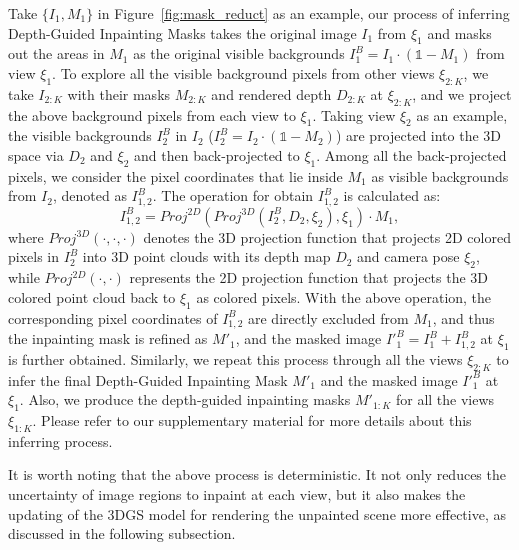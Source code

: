 
Take $\{I_1, M_1\}$ in Figure~\ref{fig:mask_reduct} as an example, our process of inferring Depth-Guided Inpainting Masks takes the original image $I_1$ from $\xi_1$ and masks out the areas in $M_1$ as the original visible backgrounds $I^B_1 = I_1\cdot(\mathds{1}-M_1)$ from view $\xi_1$. To explore all the visible background pixels from other views $\xi_{2:K}$, we take $I_{2:K}$ with their masks $M_{2:K}$ and rendered depth $D_{2:K}$ at $\xi_{2:K}$, and we project the above background pixels from each view to $\xi_1$. Taking view $\xi_2$ as an example, the visible backgrounds $I^B_2$ in $I_2$ ($I^B_2 = I_2 \cdot (\mathds{1}-M_2)$) are projected into the 3D space via $D_2$ and $\xi_2$ and then back-projected to $\xi_1$. 
Among all the back-projected pixels, we consider the pixel coordinates that lie inside $M_1$ as visible backgrounds from $I_2$, denoted as $I^B_{1,2}$. The operation for obtain $I^B_{1,2}$ is calculated as:
\begin{equation} \label{eq:proj}
    I^B_{1,2} =  Proj^{2D}(Proj^{3D}(I^B_2, D_2, \xi_2), \xi_1)\cdot M_1,
\end{equation}
where $Proj^{3D}(\cdot, \cdot, \cdot)$ denotes the 3D projection function that projects 2D colored pixels in $I^B_2$ into 3D point clouds with its depth map $D_2$ and camera pose $\xi_2$, while $Proj^{2D}(\cdot, \cdot)$ represents the 2D projection function that projects the 3D colored point cloud back to $\xi_1$ as colored pixels. With the above operation, the corresponding pixel coordinates of $I^B_{1,2}$ are directly excluded from $M_1$, and thus the inpainting mask is refined as $M'_{1}$, and the masked image ${I'}^{B}_1 = I^B_1 + I^B_{1,2}$ at $\xi_1$ is further obtained. Similarly, we repeat this process through all the views $\xi_{2:K}$ to infer the final Depth-Guided Inpainting Mask $M'_1$ and the masked image ${I'}^B_1$ at $\xi_1$. Also, we produce the depth-guided inpainting masks $M'_{1:K}$ for all the views $\xi_{1:K}$. Please refer to our supplementary material for more details about this inferring process. 

It is worth noting that the above process is deterministic. It not only reduces the uncertainty of image regions to inpaint at each view, but it also makes the updating of the 3DGS model for rendering the unpainted scene more effective, as discussed in the following subsection.

